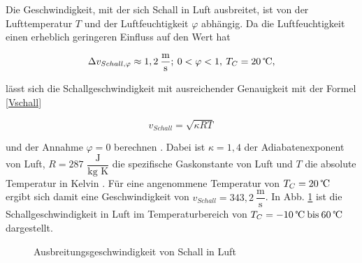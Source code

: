 Die Geschwindigkeit, mit der sich Schall in Luft ausbreitet, ist von der Lufttemperatur $T$ und der Luftfeuchtigkeit $\varphi$ abhängig. Da die Luftfeuchtigkeit einen erheblich geringeren Einfluss auf den Wert hat 

\begin{equation}
    \Delta v_{Schall,\varphi}\approx1,2\:\dfrac{\text{m}}{\text{s}}; \:0<\varphi<1, \:T_{C}=20 \:\text{\textcelsius},
    \label{Vphi}
\end{equation}

\cite{Hering:2023} lässt sich die Schallgeschwindigkeit mit ausreichender Genauigkeit mit der Formel \ref{Vschall}

\begin{equation}
    v_{Schall}=\sqrt{\kappa R T}
    \label{Vschall}
\end{equation} 

und der Annahme $\varphi=0$ berechnen \cite{Tippler:2024}. 
Dabei ist $\kappa = 1{,}4$ der Adiabatenexponent von Luft, $R=287$ \(\dfrac{\text{J}}{\text{kg K}}\) die spezifische Gaskonstante von Luft und $T$ die absolute Temperatur in Kelvin \cite{Tippler:2024,Willems:2022}.
Für eine angenommene Temperatur von $T_{C} = 20\:\text{\textcelsius}$ ergibt sich damit eine Geschwindigkeit von $v_{Schall}=343,2\:\dfrac{\text{m}}{\text{s}}$.
In Abb. \ref{schallfunktion} ist die Schallgeschwindigkeit in Luft im Temperaturbereich von $T_{C} = -10 \:\text{\textcelsius \:bis} \:60 \:\text{\textcelsius}$ dargestellt.

\begin{figure}[h]
    \begin{center}
        \caption{Ausbreitungsgeschwindigkeit von Schall in Luft}
        \label{schallfunktion}
    \end{center}
\end{figure}

